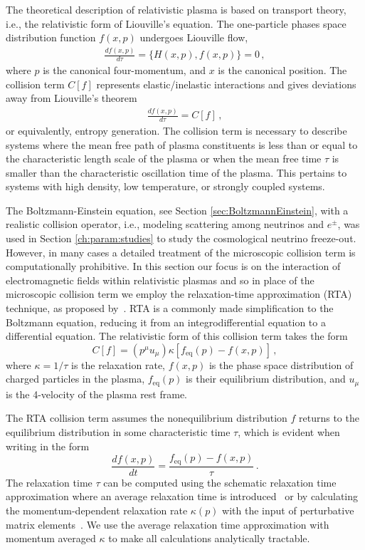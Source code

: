 The theoretical description of relativistic plasma is based on transport theory, i.e., the relativistic form of Liouville's equation. The one-particle phases space distribution function $f(x,p)$ undergoes Liouville flow,
\begin{align}
    \frac{d f(x,p)}{d\tau} = \{H(x,p), f(x,p)\} = 0\,,
\end{align}
where $p$ is the canonical four-momentum, and $x$ is the canonical position. The collision term $C[f]$ represents elastic/inelastic interactions and gives deviations away from Liouville's theorem
\begin{align}\label{eq:LpC}
    \frac{d f(x,p)}{d\tau} = C[f]\,,
\end{align}
or equivalently, entropy generation. The collision term is necessary to describe systems where the mean free path of plasma constituents is less than or equal to the characteristic length scale of the plasma or when the mean free time $\tau$ is smaller than the characteristic oscillation time of the plasma. This pertains to systems with high density, low temperature, or strongly coupled systems.

The Boltzmann-Einstein equation, see Section \ref{sec:BoltzmannEinstein}, with a realistic collision operator, i.e., modeling scattering among neutrinos and $e^\pm$, was used in Section \ref{ch:param:studies} to  study the cosmological neutrino freeze-out. However, in many cases a detailed treatment of the microscopic collision term  is computationally prohibitive.  In this section our focus is on the interaction of electromagnetic fields within relativistic plasmas and so in place of the microscopic collision term we employ the relaxation-time approximation (RTA) technique, as proposed by~\cite{Anderson:1974nyl}. RTA is a commonly made simplification to the Boltzmann equation, reducing it from an integrodifferential equation to a differential equation. The relativistic form of this collision term takes the form
\begin{equation}\label{eq:lincoll}
C[f] = (p^\mu u_\mu) \kappa [ f_\mathrm{eq}(p) - f(x,p) ] \,,
\end{equation}
where $\kappa=1/\tau$ is the relaxation rate, $f(x,p)$ is the phase space distribution of charged particles in the plasma, $f_\mathrm{eq}(p)$ is their equilibrium distribution, and $u_\mu$ is the 4-velocity of the plasma rest frame.

The RTA collision term assumes the nonequilibrium distribution $f$ returns to the equilibrium distribution in some characteristic time $\tau$, which is evident when writing  in the form
\begin{equation}
    \frac{d f(x,p)}{dt} = \frac{f_\mathrm{eq}(p) - f(x,p) }{\tau}\,.
\end{equation}
The relaxation time $\tau$ can be computed using the schematic relaxation time approximation where an average relaxation time is introduced~\cite{Mrowczynski:1988xu,Satow:2014lia} or by calculating the momentum-dependent relaxation rate $\kappa(p)$ with the input of perturbative matrix elements~\cite{Ahonen:1996nq}. We use the average relaxation time approximation with momentum averaged $\kappa$ to make all calculations analytically tractable.

